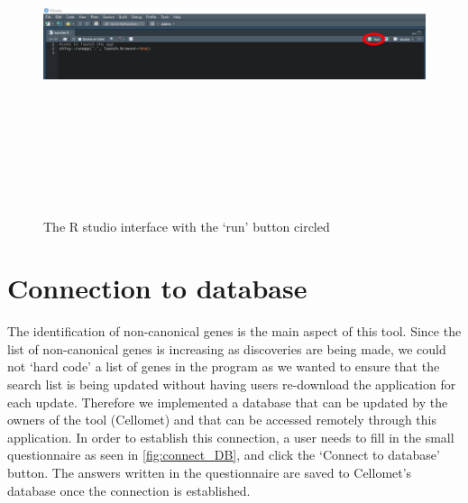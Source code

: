\documentclass[11pt]{article}
\begin{document}
\begin{enumerate}
\begin{figure}[h!]
\centering
\includegraphics[width=15cm,height=10cm,keepaspectratio]{R_studio_run_app.png}
\caption{The R studio interface with the `run' button circled}
\label{fig:r_studio}
\end{figure}

\end{enumerate}


\section{Connection to database}
The identification of non-canonical genes is the main aspect of this tool. Since the list of non-canonical genes is increasing as discoveries are being made, we could not `hard code' a list of genes in the program as we wanted to ensure that the search list is being updated without having users re-download the application for each update. Therefore we implemented a database that can be updated by the owners of the tool (Cellomet) and that can be accessed remotely through this application.
In order to establish this connection, a user needs to fill in the small questionnaire as seen in \autoref{fig:connect_DB}, and click the `Connect to database' button. The answers written in the questionnaire are saved to Cellomet's database once the connection is established.
\end{document}

